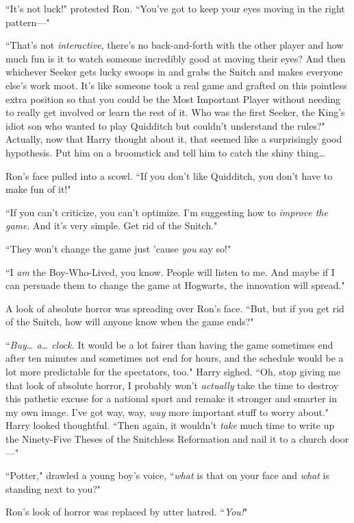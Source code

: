 ``It's not luck!" protested Ron. ``You've got to keep your eyes moving in the right pattern—"

``That's not \emph{interactive}, there's no back-and-forth with the other player and how much fun is it to watch someone incredibly good at moving their eyes? And then whichever Seeker gets lucky swoops in and grabs the Snitch and makes everyone else's work moot. It's like someone took a real game and grafted on this pointless extra position so that you could be the Most Important Player without needing to really get involved or learn the rest of it. Who was the first Seeker, the King's idiot son who wanted to play Quidditch but couldn't understand the rules?" Actually, now that Harry thought about it, that seemed like a surprisingly good hypothesis. Put him on a broomstick and tell him to catch the shiny thing{\ldots}

Ron's face pulled into a scowl. ``If you don't like Quidditch, you don't have to make fun of it!"

``If you can't criticize, you can't optimize. I'm suggesting how to \emph{improve the game}. And it's very simple. Get rid of the Snitch."

``They won't change the game just 'cause \emph{you} say so!"

``I \emph{am} the Boy-Who-Lived, you know. People will listen to me. And maybe if I can persuade them to change the game at Hogwarts, the innovation will spread."

A look of absolute horror was spreading over Ron's face. ``But, but if you get rid of the Snitch, how will anyone know when the game ends?"

``\emph{Buy{\ldots} a{\ldots} clock.} It would be a lot fairer than having the game sometimes end after ten minutes and sometimes not end for hours, and the schedule would be a lot more predictable for the spectators, too." Harry sighed. ``Oh, stop giving me that look of absolute horror, I probably won't \emph{actually} take the time to destroy this pathetic excuse for a national sport and remake it stronger and smarter in my own image. I've got way, way, \emph{way} more important stuff to worry about." Harry looked thoughtful. ``Then again, it wouldn't \emph{take} much time to write up the Ninety-Five Theses of the Snitchless Reformation and nail it to a church door—"

``Potter," drawled a young boy's voice, ``\emph{what} is that on your face and \emph{what} is standing next to you?"

Ron's look of horror was replaced by utter hatred. ``\emph{You!}"

